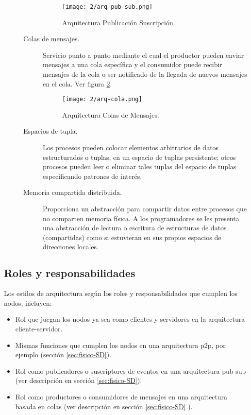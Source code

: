 \begin{description}
\begin{description}
		\begin{figure}[h]%
			\texttt{[image: 2/arq-pub-sub.png]}
			\caption{Arquitectura Publicaci\'on Suscripci\'on. }
			\label{fig:Arq-pubsub}
		\end{figure}
		
		
		\item[Colas de mensajes.]  Servicio punto a punto mediante el cual el productor pueden enviar mensajes a una cola específica y el consumidor puede recibir mensajes de la cola o ser notificado de la llegada de nuevos mensajes en el cola.
		Ver figura \ref{fig:Arq-cola}.
		
		\begin{figure}[h]%
			\texttt{[image: 2/arq-cola.png]}
			\caption{Arquitectura Colas de Mensajes.}
			\label{fig:Arq-cola}
		\end{figure}
		
		\item[Espacios de tupla.] Los procesos pueden colocar elementos arbitrarios de datos estructurados o tuplas, en un espacio de tuplas persistente;  otros procesos pueden leer o eliminar tales tuplas del espacio de tuplas especificando patrones de interés.    
		
		\item[Memoria compartida distribuida.]  Proporciona un abstracción para compartir datos entre procesos que no comparten memoria física. A los programadores se les presenta una abstracción  de lectura o escritura de estructuras de datos (compartidas) como si estuvieran en sus propios espacios de direcciones locales.   
		
	\end{description} 	 	
	
\end{description}


\subsection { Roles y responsabilidades} 
\label{subsec:roles}
Los estilos de arquitectura seg\'un los roles y responsabilidades que cumplen los nodos,  incluyen: 
\begin{itemize}
	\item Rol que juegan los nodos ya sea como clientes y servidores en la arquitectura cliente-servidor. 
	\item Mismas funciones que cumplen los nodos en una arquitectura p2p, por ejemplo (sección \ref{sec:fisico-SD}).
	\item Rol como publicadores o suscriptores de eventos en una arquitectura pub-sub (ver descripci\'on en sección \ref{sec:fisico-SD}).
	\item Rol como productores o consumidores de mensajes en una arquitectura basada en colas (ver descripci\'on en sección \ref{sec:fisico-SD} ).
	
\end{itemize}

